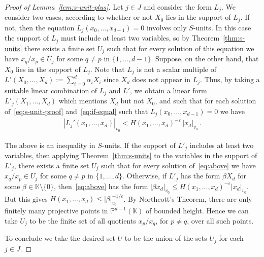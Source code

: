 \documentclass[a4paper,UKenglish,cleveref, autoref, thm-restate]{lipics-v2021}
\begin{document}
\begin{proof}[Proof of Lemma~\ref{lem:s-unit-plus}]
Let $j \in J$ and consider the form $L_j$.  We consider two cases, according to whether or not $X_0$ lies in the support of $L_j$.  If not, then the equation 
$L_j(x_0,\ldots,x_{d-1})=0$ involves only $S$-units.  In this case the support of $L_j$ must include at least two variables, so
by Theorem~\ref{thm:s-units} there exists a finite set $U_j$ such that for every solution of this equation
we have $x_q/x_p \in U_j$ for some $q\neq p$ in $\{1,\ldots,d-1\}$.
Suppose, on the other hand, that $X_0$ lies in the support of $L_j$.
Note that $L_j$ is not a scalar multiple of $L'(X_0,\ldots,X_d):=\sum_{i=0}^d \alpha_i X_i$ since $X_d$ does not appear in $L_j$.
Thus, by taking a suitable linear combination of $L_j$ and $L'$, we obtain a linear form $L'_j(X_1,\ldots,X_d)$ which mentions $X_d$ but not $X_0$, and
such that for each solution of~\eqref{eq:s-unit-proof} and~\eqref{eq:if-equal} such that
$L_j(x_0,\ldots,x_{d-1})=0$ we have
\begin{gather}
|L_j'(x_1,\ldots,x_d)|_{v_0} <  H(x_1,\ldots,x_d)^{-\varepsilon} \, |x_d|_{v_0} \, .
\label{eq:above}
\end{gather}

The above is an inequality in $S$-units.  If the support of $L'_j$ includes at least two variables,  then
applying Theorem~\ref{thm:s-units} to the variables in the support of $L'_j$, there exists a finite set $U_j$ such that for every solution of~\eqref{eq:above}
we have $x_q/x_p \in U_j$ for some $q\neq p$ in $\{1,\ldots,d\}$.  Otherwise, if $L'_j$ has the form $\beta X_d$
for some $\beta\in\mathbb K \setminus\{0\}$, then~\eqref{eq:above} has the form $|\beta x_d|_{v_0} \leq H(x_1,\ldots,x_d)^{-\varepsilon}|x_d|_{v_0}$.
But this gives $H(x_1,\ldots,x_d) \leq |\beta|_{v_0}^{-1/\varepsilon}$.  By Northcott's Theorem, 
there are only finitely many projective points in $\mathbb P^{d-1}(\mathbb K)$ of bounded height.
Hence we can take $U_j$ to be the finite set of all quotients $x_p/x_q$, for $p\neq q$, over all such points.

To conclude we take the desired set $U$ to be the union of the sets $U_j$ for each $j \in J$.
\end{proof}
\end{document}

